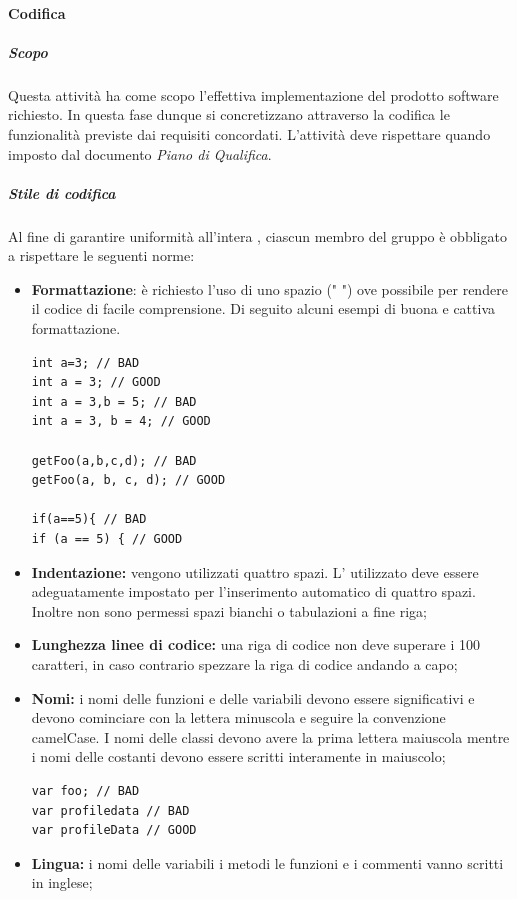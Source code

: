 		\paragraph{Codifica}
		\label{sec:codifica}
			\subparagraph{Scopo} \Spazio
			Questa attività ha come scopo l'effettiva implementazione del prodotto software richiesto. In questa fase dunque si concretizzano attraverso la codifica le funzionalità previste dai requisiti concordati.
			L'attività deve rispettare quando imposto dal documento \textit{Piano di Qualifica}.
			\subparagraph{Stile di codifica} \Spazio
			Al fine di garantire uniformità all'intera , ciascun membro del gruppo è obbligato a rispettare le seguenti norme:
			\begin{itemize}
			\item \textbf{Formattazione}: è richiesto l'uso di uno spazio (" ") ove possibile per rendere il codice di facile comprensione.
			Di seguito alcuni  esempi di buona e cattiva formattazione.
\begin{lstlisting}
int a=3; // BAD
int a = 3; // GOOD
int a = 3,b = 5; // BAD
int a = 3, b = 4; // GOOD

getFoo(a,b,c,d); // BAD
getFoo(a, b, c, d); // GOOD

if(a==5){ // BAD
if (a == 5) { // GOOD
\end{lstlisting}
			
			\item \textbf{Indentazione:} vengono utilizzati quattro spazi. L' utilizzato deve essere adeguatamente impostato per l'inserimento automatico di quattro spazi. Inoltre non sono permessi spazi bianchi o tabulazioni a fine riga;
			
			\item \textbf{Lunghezza linee di codice:} una riga di codice non deve superare i 100 caratteri, in caso contrario spezzare la riga di codice andando a capo;
			
			\item \textbf{Nomi:} i nomi delle funzioni e delle variabili devono essere significativi e devono cominciare con la lettera minuscola e seguire la convenzione camelCase. I nomi delle classi devono avere la prima lettera maiuscola mentre i nomi delle costanti devono essere scritti interamente in maiuscolo;
\begin{lstlisting}
var foo; // BAD
var profiledata // BAD
var profileData // GOOD
\end{lstlisting}
			
			\item \textbf{Lingua:} i nomi delle variabili i metodi le funzioni e i commenti vanno scritti in inglese;
			

\end{itemize}
